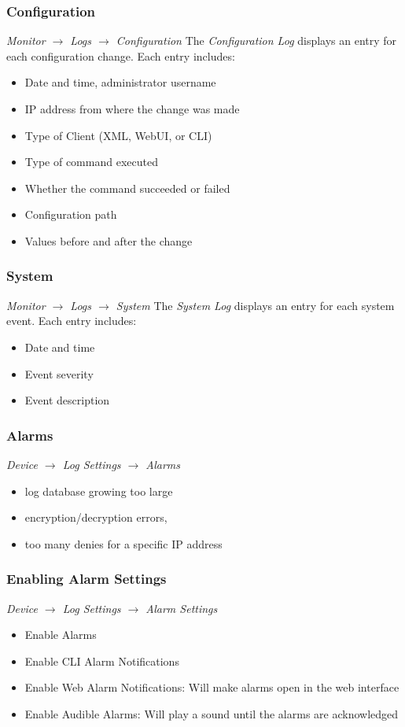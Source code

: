 \subsubsection{Configuration}
\textit{Monitor $\rightarrow$ Logs $\rightarrow$ Configuration}
\newline
The  \textit{Configuration Log} displays an entry for each configuration change. Each entry includes:
\begin{itemize}
    \item Date and time, administrator username
    \item IP address from where the change was made
    \item Type of Client (XML, WebUI, or CLI)
    \item Type of command executed
    \item Whether the command succeeded or failed
    \item Configuration path
    \item Values before and after the change
\end{itemize}

\subsubsection{System}
\textit{Monitor $\rightarrow$ Logs $\rightarrow$ System}
The \textit{System Log} displays an entry for each system event. Each entry includes:
\begin{itemize}
    \item Date and time
    \item Event severity
    \item Event description
\end{itemize}

\subsubsection{Alarms}
\textit{Device $\rightarrow$ Log Settings $\rightarrow$ Alarms}
\newline
\begin{itemize}
    \item log database growing too large
    \item encryption/decryption errors,
    \item too many denies for a specific IP address
\end{itemize}

\subsubsection{Enabling Alarm Settings}
\textit{Device $\rightarrow$ Log Settings $\rightarrow$ Alarm Settings}
\newline
\begin{itemize}
    \item Enable Alarms
    \item Enable CLI Alarm Notifications
    \item Enable Web Alarm Notifications: Will make alarms open in the web interface
    \item Enable Audible Alarms: Will play a sound until the alarms are acknowledged
\end{itemize}

